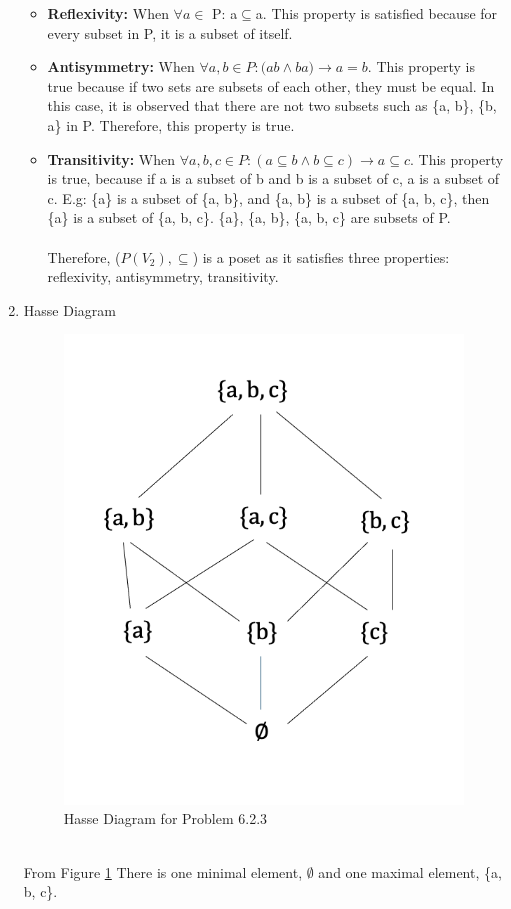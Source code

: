 \begin{enumerate}
\begin{itemize}
        \item \textbf{Reflexivity: } When $\forall a \in$ P: a$\subseteq$a. This property is satisfied because for every subset in P, it is a subset of itself. 
        \item \textbf{Antisymmetry: } When $\forall a, b \in P: (a$\subseteq$b \wedge  b$\subseteq$a) \rightarrow a = b$. This property is true because if two sets are subsets of each other, they must be equal. In this case, it is observed that there are not two subsets such as \{a, b\}, \{b, a\} in P. Therefore, this property is true.
        \item \textbf{Transitivity:} When $\forall a, b, c \in P: (a\subseteq b \wedge b\subseteq c) \rightarrow a\subseteq c$. This property is true, because if a is a subset of b and b is a subset of c, a is a subset of c. E.g: \{a\} is a subset of \{a, b\}, and \{a, b\} is a subset of \{a, b, c\}, then \{a\} is a subset of \{a, b, c\}. \{a\}, \{a, b\}, \{a, b, c\} are subsets of P. \\ \\
        Therefore, ($\textit{P}(V_{2}), \subseteq$) is a poset as it satisfies three properties: reflexivity, antisymmetry, transitivity. 
    \end{itemize}
    \item Hasse Diagram \\
    \begin{figure}[hbt!]
        \centering
        \includegraphics[scale=0.5]{HasseProblem63.png}
        \caption{Hasse Diagram for Problem 6.2.3}
        \label{fig:Hasse63}
    \end{figure}\\
    From Figure \ref{fig:Hasse63} There is one minimal element, $\emptyset$ and one maximal element, \{a, b, c\}.

\end{enumerate}
